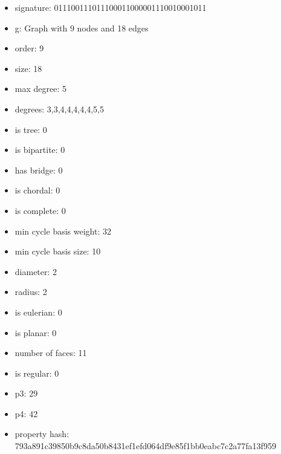 \newpage
\begin{figure}
\end{figure}
\begin{itemize}
\item signature: 011100111011100011000001110010001011
\item g: Graph with 9 nodes and 18 edges
\item order: 9
\item size: 18
\item max degree: 5
\item degrees: 3,3,4,4,4,4,4,5,5
\item is tree: 0
\item is bipartite: 0
\item has bridge: 0
\item is chordal: 0
\item is complete: 0
\item min cycle basis weight: 32
\item min cycle basis size: 10
\item diameter: 2
\item radius: 2
\item is eulerian: 0
\item is planar: 0
\item number of faces: 11
\item is regular: 0
\item p3: 29
\item p4: 42
\item property hash: 793a891c39850b9c8da50b8431ef1efd064df9e85f1bb0eabc7c2a77fa13f959
\end{itemize}
